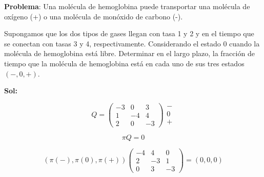 \documentclass[12pt,a4paper]{article}
\begin{document}

\textbf{Problema}: Una molécula de hemoglobina puede transportar una molécula de oxígeno (+) o una molécula de monóxido de carbono (-).

Supongamos que los dos tipos de gases llegan con tasa 1 y 2 y en el tiempo que se conectan con tasas 3 y 4, respectivamente. Considerando el estado 0 cuando la molécula de hemoglobina está libre. Determinar en el largo plazo, la fracción de tiempo que la molécula de hemoglobina está en cada uno de sus tres estados $(-, 0, +)$.

\textbf{Sol:}

\begin{center}
\end{center}

\begin{equation*}
Q = \begin{pmatrix}
-3 & 0 & 3 \\
1 & -4 & 4 \\
2 & 0 & -3
\end{pmatrix}
\begin{matrix}
- \\
0 \\
+
\end{matrix}
\end{equation*}

\begin{equation*}
\pi Q = 0
\end{equation*}

\begin{equation*}
(\pi(-), \pi(0), \pi(+)) \begin{pmatrix}
-4 & 4 & 0 \\
2 & -3 & 1 \\
0 & 3 & -3
\end{pmatrix} = (0, 0, 0)
\end{equation*}
\end{document}

